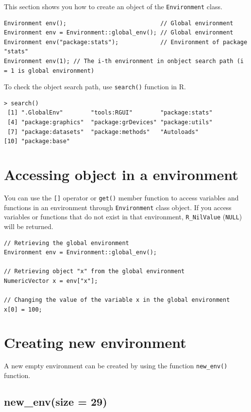 \documentclass[]{book}
\theoremstyle{definition}
\theoremstyle{definition}
\theoremstyle{remark}
\begin{document}
This section shows you how to create an object of the
\texttt{Environment} class.

\begin{verbatim}
Environment env();                           // Global environment
Environment env = Environment::global_env(); // Global environment
Environment env("package:stats");            // Environment of package "stats"
Environment env(1); // The i-th environment in onbject search path (i = 1 is global environment)
\end{verbatim}

To check the object search path, use \texttt{search()} function in R.

\begin{verbatim}
> search()
 [1] ".GlobalEnv"        "tools:RGUI"        "package:stats"    
 [4] "package:graphics"  "package:grDevices" "package:utils"    
 [7] "package:datasets"  "package:methods"   "Autoloads"        
[10] "package:base"   
\end{verbatim}

\section{Accessing object in a
environment}\label{accessing-object-in-a-environment}

You can use the \texttt{{[}{]}} operator or \texttt{get()} member
function to access variables and functions in an environment through
\texttt{Environment} class object. If you access variables or functions
that do not exist in that environment, \texttt{R\_NilValue}
(\texttt{NULL}) will be returned.

\begin{verbatim}
// Retrieving the global environment
Environment env = Environment::global_env();

// Retrieving object "x" from the global environment
NumericVector x = env["x"];

// Changing the value of the variable x in the global environment
x[0] = 100;
\end{verbatim}

\section{Creating new environment}\label{creating-new-environment}

A new empty environment can be created by using the function
\texttt{new\_env()} function.

\subsection{new\_env(size = 29)}\label{new_envsize-29}
\end{document}
